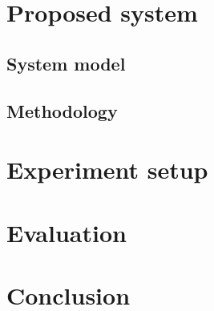 \documentclass{ieeeaccess}
\begin{document}
\section{Proposed system}
\label{sec:proposed}

\subsection{System model}
\label{sec:system}


\subsection{Methodology}
\label{sec:method}


\section{Experiment setup}
\label{sec:experiment}

            
\section{Evaluation}
\label{sec:evaluation}

\clearpage

\section{Conclusion}
\label{sec:conclusion}





\vspace{11pt}



\EOD
\end{document}
